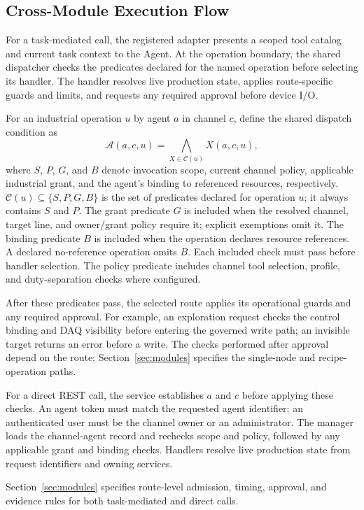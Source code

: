 \subsection{Cross-Module Execution Flow}
\label{sec:executionflow}
For a task-mediated call, the registered adapter presents a scoped tool
catalog and current task context to the Agent. At the operation boundary, the
shared dispatcher checks the predicates declared for the named operation
before selecting its handler. The handler resolves live production state,
applies route-specific guards and limits, and requests any required approval
before device I/O.

For an industrial operation $u$ by agent $a$ in channel $c$, define the
shared dispatch condition as
\begin{equation}
\mathcal{A}(a,c,u)=\bigwedge_{X\in\mathcal{C}(u)}X(a,c,u),
\label{eq:dispatch-contract}
\end{equation}
where $S$, $P$, $G$, and $B$ denote invocation scope, current channel policy,
applicable industrial grant, and the agent's binding to referenced resources,
respectively. $\mathcal{C}(u)\subseteq\{S,P,G,B\}$ is the set of predicates
declared for operation $u$; it always contains $S$ and $P$. The grant predicate
$G$ is included when the resolved channel, target line, and owner/grant policy
require it; explicit exemptions omit it. The binding predicate $B$ is included
when the operation declares resource references. A declared no-reference
operation omits $B$. Each included check must pass before handler selection. The policy predicate
includes channel tool selection, profile, and duty-separation checks where
configured.

After these predicates pass, the selected route applies its operational
guards and any required approval. For example, an exploration request checks
the control binding and DAQ visibility before entering the governed write
path; an invisible target returns an error before a write. The checks performed
after approval depend on the route; Section~\ref{sec:modules} specifies the
single-node and recipe-operation paths.

For a direct REST call, the service establishes $a$ and $c$ before applying
these checks. An agent token must match the requested agent identifier; an
authenticated user must be the channel owner or an administrator. The manager
loads the channel-agent record and rechecks scope and policy, followed by any
applicable grant and binding checks. Handlers resolve live production state
from request identifiers and owning services.

Section~\ref{sec:modules} specifies route-level admission, timing, approval,
and evidence rules for both task-mediated and direct calls.


